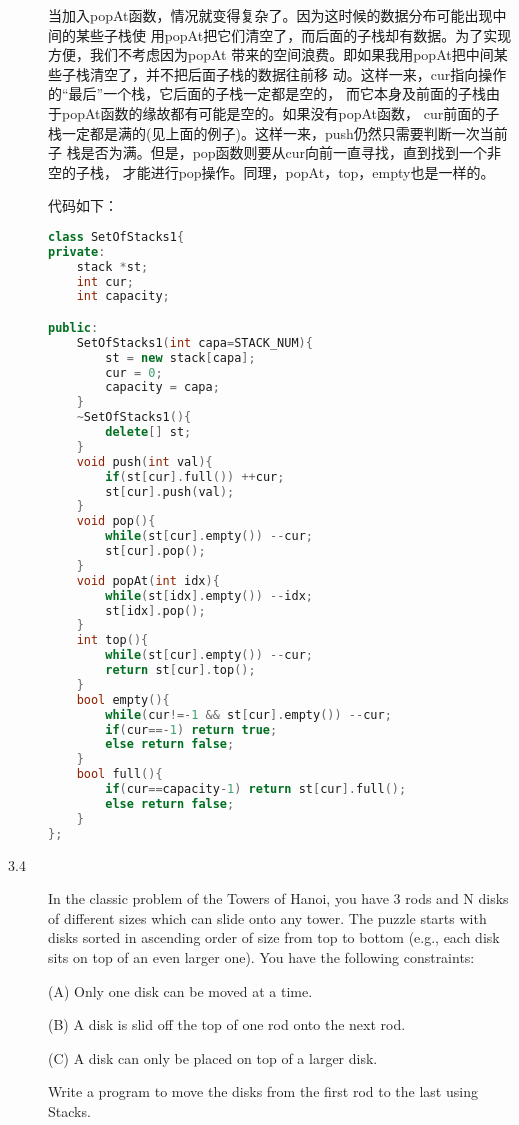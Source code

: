 \begin{description}
当加入popAt函数，情况就变得复杂了。因为这时候的数据分布可能出现中间的某些子栈使 用popAt把它们清空了，而后面的子栈却有数据。为了实现方便，我们不考虑因为popAt 带来的空间浪费。即如果我用popAt把中间某些子栈清空了，并不把后面子栈的数据往前移 动。这样一来，cur指向操作的“最后”一个栈，它后面的子栈一定都是空的， 而它本身及前面的子栈由于popAt函数的缘故都有可能是空的。如果没有popAt函数， cur前面的子栈一定都是满的(见上面的例子)。这样一来，push仍然只需要判断一次当前子 栈是否为满。但是，pop函数则要从cur向前一直寻找，直到找到一个非空的子栈， 才能进行pop操作。同理，popAt，top，empty也是一样的。

代码如下：

\begin{lstlisting}[language=C++]
class SetOfStacks1{
private:
    stack *st;
    int cur;
    int capacity;

public:
    SetOfStacks1(int capa=STACK_NUM){
        st = new stack[capa];
        cur = 0;
        capacity = capa;
    }
    ~SetOfStacks1(){
        delete[] st;
    }
    void push(int val){
        if(st[cur].full()) ++cur;
        st[cur].push(val);
    }
    void pop(){
        while(st[cur].empty()) --cur;
        st[cur].pop();
    }
    void popAt(int idx){
        while(st[idx].empty()) --idx;
        st[idx].pop();
    }
    int top(){
        while(st[cur].empty()) --cur;
        return st[cur].top();
    }
    bool empty(){
        while(cur!=-1 && st[cur].empty()) --cur;
        if(cur==-1) return true;
        else return false;
    }
    bool full(){
        if(cur==capacity-1) return st[cur].full();
        else return false;        
    }
};
\end{lstlisting}




\item[3.4] In the classic problem of the Towers of Hanoi, you have 3 rods and N disks of different sizes which can slide onto any tower. The puzzle starts with disks sorted in ascending order of size from top to bottom (e.g., each disk sits on top of an even larger one). You have the following constraints:	

(A) Only one disk can be moved at a time.

(B) A disk is slid off the top of one rod onto the next rod.

(C) A disk can only be placed on top of a larger disk.

Write a program to move the disks from the first rod to the last using Stacks.


\end{description}
